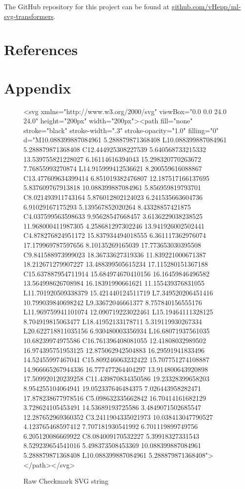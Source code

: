\documentclass[11pt]{article}
\begin{document}
The GitHub repository for this project can be found at \href{https://github.com/vHepp/ml-svg-transformers}{github.com/vHepp/ml-svg-transformers}.

\section{References}

\printbibliography[heading=none]


\section{Appendix}

\begin{figure}[htbp]
	\centering
	{\color{IBMblue}<svg xmlns="http://www.w3.org/2000/svg" viewBox="0.0 0.0 24.0 24.0"
	height="200px" width="200px">{\color{IBMorange}<path fill="none" stroke="black" stroke-width=".3"
	stroke-opacity="1.0"  filling="0"
	{\color{IBMpurple}d="M10.088399887084961 5.288879871368408 L10.088399887084961 5.288879871368408
	C12.444925308227539 5.640568733215332 13.539755821228027 6.16114616394043
	15.298320770263672 7.76855993270874 L14.915999412536621 8.200559616088867
	C13.477609634399414 6.851019382476807 12.187517166137695 5.837609767913818
	10.088399887084961 5.856959819793701 C8.021493911743164 5.876012802124023
	6.241535663604736 6.91029167175293 5.139567852020264 8.43328857421875
	C4.037599563598633 9.95628547668457 3.6136229038238525 11.968000411987305
	4.258681297302246 13.941926002502441 C4.878276824951172 15.837934494018555
	6.361117362976074 17.179969787597656 8.10135269165039 17.773653030395508
	C9.841588973999023 18.36733627319336 11.839221000671387 18.212671279907227
	13.488399505615234 17.115280151367188 C15.637887954711914 15.684974670410156
	16.16459846496582 13.564998626708984 16.18391990661621 11.155439376831055
	L11.701920509338379 15.421440124511719 L7.349520206451416 10.799039840698242
	L9.33672046661377 8.757840156555176 L11.969759941101074 12.090719223022461
	L15.19464111328125 8.704919815063477 L18.41952133178711 5.319119930267334
	L20.622718811035156 6.930480003356934 L16.68071937561035 10.68239974975586
	C16.761396408081055 12.41808032989502 16.974395751953125 12.875062942504883
	16.29591941833496 14.52455997467041 C15.809246063232422 15.707751274108887
	14.966665267944336 16.777477264404297 13.914800643920898 17.509920120239258
	C11.439870834350586 19.23328399658203 8.954255104064941 19.052337646484375
	7.026443958282471 17.878238677978516 C5.098632335662842 16.70414161682129
	3.728624105453491 14.53689193725586 3.4849071502685547 12.287652969360352
	C3.2411904335021973 10.038413047790527 4.123765468597412 7.707181930541992
	6.701119899749756 6.205120086669922 C8.084009170532227 5.39918327331543
	8.529239654541016 5.498373508453369 10.088399887084961 5.288879871368408
	L10.088399887084961 5.288879871368408"}></path>}</svg>}
	\caption{Raw Checkmark SVG string}
	\label{raw_checkmark}
\end{figure}
\end{document}
